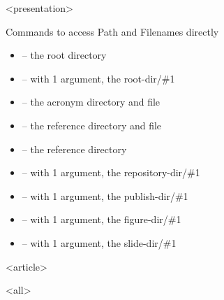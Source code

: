 \mode
<presentation>

\begin{frame}{Commands to access Path and Filenames directly}
  \label{manual:paths}

  \begin{itemize}
    \item \cmd{\skbfileroot} -- the root directory
    \item \cmd{\skbpathroot} -- with 1 argument, the root-dir/\#1
    \item \cmd{\skbfileacr} -- the acronym directory and file
    \item \cmd{\skbfilebib} -- the reference directory and file
    \item \cmd{\skbpathbib} -- the reference directory
    \item \cmd{\skbfilerep} -- with 1 argument, the repository-dir/\#1
    \item \cmd{\skbfilepub} -- with 1 argument, the publish-dir/\#1
    \item \cmd{\skbfilefig} -- with 1 argument, the figure-dir/\#1
    \item \cmd{\skbfilesli} -- with 1 argument, the slide-dir/\#1
  \end{itemize}

  \begin{example}
    }
  \end{example}

\end{frame}


\mode
<article>

\bigskip


\clearpage

\mode
<all>
